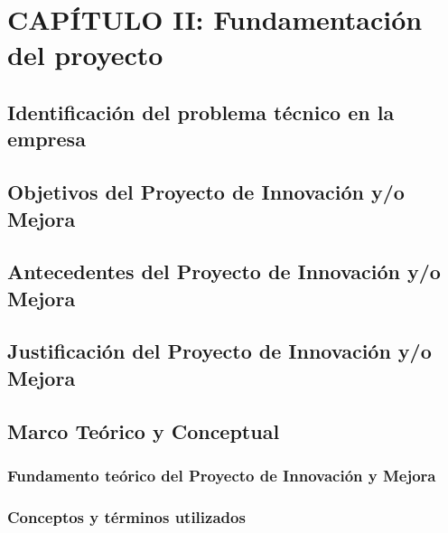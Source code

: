 \section{CAPÍTULO II: Fundamentación del proyecto}
\subsection{Identificación del problema técnico en la empresa}
\subsection{Objetivos del Proyecto de Innovación y/o Mejora}
\subsection{Antecedentes del Proyecto de Innovación y/o Mejora}
\subsection{Justificación del Proyecto de Innovación y/o Mejora}
\subsection{Marco Teórico y Conceptual}
\subsubsection{Fundamento teórico del Proyecto de Innovación y Mejora}
\subsubsection{Conceptos y términos utilizados}